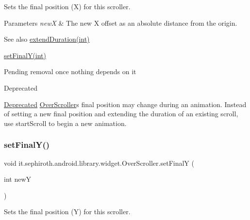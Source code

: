 Sets the final position (X) for this scroller.


\begin{DoxyParams}{Parameters}
{\em newX} & The new X offset as an absolute distance from the origin. \\
\hline
\end{DoxyParams}
\begin{DoxySeeAlso}{See also}
\hyperlink{classit_1_1sephiroth_1_1android_1_1library_1_1widget_1_1_over_scroller_a94c0a3042a747b6212859cc06bf749d5}{extend\+Duration(int)} 

\hyperlink{classit_1_1sephiroth_1_1android_1_1library_1_1widget_1_1_over_scroller_a9ef2e1e21a97339f297abd812518828e}{set\+Final\+Y(int)}
\end{DoxySeeAlso}
Pending removal once nothing depends on it \begin{DoxyRefDesc}{Deprecated}
\item[\hyperlink{deprecated__deprecated000004}{Deprecated}]\hyperlink{classit_1_1sephiroth_1_1android_1_1library_1_1widget_1_1_over_scroller}{Over\+Scroller}\textquotesingle{}s final position may change during an animation. Instead of setting a new final position and extending the duration of an existing scroll, use start\+Scroll to begin a new animation. \end{DoxyRefDesc}
\mbox{\label{classit_1_1sephiroth_1_1android_1_1library_1_1widget_1_1_over_scroller_a9ef2e1e21a97339f297abd812518828e}} 
\subsubsection{\texorpdfstring{set\+Final\+Y()}{setFinalY()}}
{\footnotesize\ttfamily void it.\+sephiroth.\+android.\+library.\+widget.\+Over\+Scroller.\+set\+FinalY (\begin{DoxyParamCaption}\item[{int}]{newY }\end{DoxyParamCaption})}

Sets the final position (Y) for this scroller.


